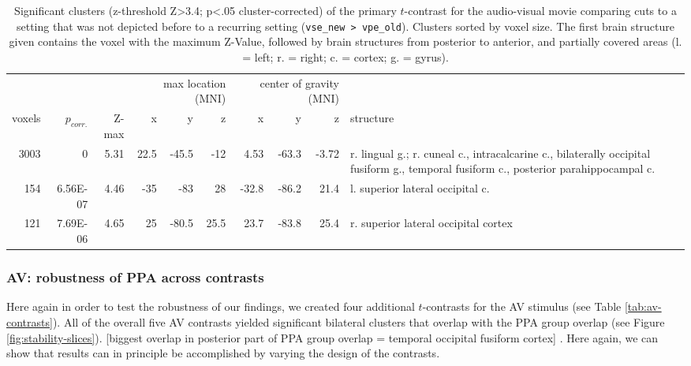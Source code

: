 \documentclass[english]{article}
\begin{document}
\begin{table}[t]
\caption{Significant clusters (z-threshold Z>3.4; p<.05 cluster-corrected)
    of the primary $t$-contrast for the audio-visual movie comparing cuts to a
    setting that was not depicted before to a recurring setting
    (\texttt{vse\_new > vpe\_old}).
    Clusters sorted by voxel size.
    The first brain structure given contains the voxel with the maximum Z-Value,
    followed by brain structures from posterior to anterior, and partially
    covered areas (l. = left; r. = right; c. = cortex; g. = gyrus).}
\label{tab:res-av-group1}
\begin{tabular}{rrrrrrrrrp{3cm}}
\toprule
& & & \multicolumn{3}{r}{max location (MNI)} & \multicolumn{3}{r}{center of gravity (MNI)} &
\\ \cmidrule{4-6} \cmidrule{7-9}
voxels & $p_{corr.}$ & Z-max & x & y & z  & x & y & z & structure \\
\midrule
3003 & 0 & 5.31 & 22.5 & -45.5 & -12 & 4.53 & -63.3 & -3.72 & r. lingual g.; r. cuneal c., intracalcarine c., bilaterally occipital fusiform g., temporal fusiform c., posterior parahippocampal c.  \\
154 & 6.56E-07 & 4.46 & -35 & -83 & 28 & -32.8 & -86.2 & 21.4 & l. superior lateral occipital c. \\
121 & 7.69E-06 & 4.65 & 25 & -80.5 & 25.5 & 23.7 & -83.8 & 25.4 & r. superior lateral occipital cortex \\
\bottomrule
\end{tabular}
\end{table}

\subsubsection{AV: robustness of PPA across contrasts}

Here again in order to test the robustness of our findings, we created four
additional $t$-contrasts for the AV stimulus (see Table \ref{tab:av-contrasts}).
All of the overall five AV contrasts yielded significant bilateral clusters that
overlap with the PPA group overlap (see Figure \ref{fig:stability-slices}).
[biggest overlap in posterior part of PPA group overlap  = temporal occipital
fusiform cortex] .
Here again, we can show that results can in principle be accomplished by varying
the design of the contrasts.
\end{document}
